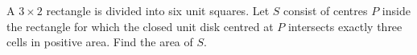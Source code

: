 A $3\times2$ rectangle is divided into six unit squares. Let $S$ consist of centres $P$ inside the rectangle for which the closed unit disk centred at $P$ intersects exactly three cells in positive area. Find the area of $S$.
